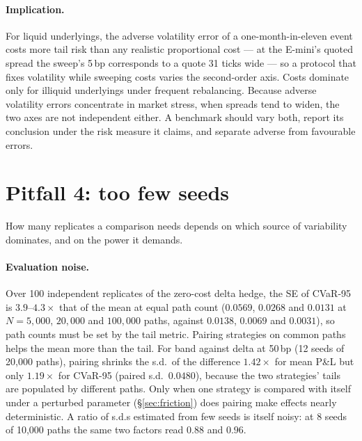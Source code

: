 \documentclass{article}
\newcommand{\cvar}{CVaR-95}
\newcommand{\bps}{\,bp}
\begin{document}
\paragraph{Implication.} For liquid underlyings, the adverse volatility error of a
one-month-in-eleven event costs more tail risk than any realistic proportional cost --- at the
E-mini's quoted spread the sweep's 5\bps{} corresponds to a quote 31 ticks wide --- so a protocol
that fixes volatility while sweeping costs varies the second-order axis. Costs dominate only for
illiquid underlyings under frequent rebalancing. Because adverse volatility errors concentrate in
market stress, when spreads tend to widen, the two axes are not independent either. A benchmark
should vary both, report
its conclusion under the risk measure it claims, and separate adverse from favourable errors.

\section{Pitfall 4: too few seeds}\label{sec:noise}

How many replicates a comparison needs depends on which source of variability dominates, and on
the power it demands.

\paragraph{Evaluation noise.} Over 100 independent replicates of the zero-cost delta hedge, the
SE of \cvar{} is $3.9$--$4.3\times$ that of the mean at equal path count ($0.0569$, $0.0268$ and
$0.0131$ at $N = 5{,}000$, $20{,}000$ and $100{,}000$ paths, against $0.0138$, $0.0069$ and
$0.0031$), so path counts must be set by the tail metric. Pairing strategies on common paths helps
the mean more than the tail. For band against delta at 50\bps{} (12 seeds of 20{,}000 paths),
pairing shrinks the s.d.\ of the difference $1.42\times$ for mean P\&L but only $1.19\times$ for
\cvar{} (paired s.d.\ $0.0480$), because the two strategies' tails are populated by different
paths. Only when one strategy is compared with itself under a perturbed parameter
(\S\ref{sec:friction}) does pairing make effects nearly deterministic. A ratio of s.d.s estimated
from few seeds is itself noisy: at 8 seeds of 10{,}000 paths the same two factors read $0.88$ and
$0.96$.
\end{document}
